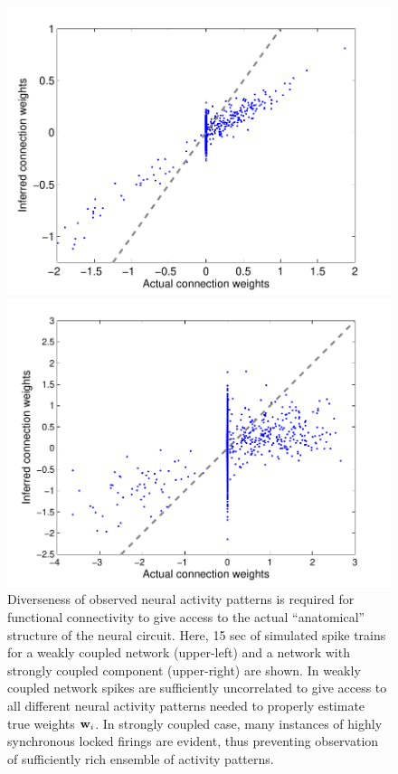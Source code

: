 \begin{figure}[h]
\begin{minipage}[c]{0.45\hsize}
\includegraphics[width=\hsize]{../figs/FigureA8_weak_corr}
\end{minipage}
\begin{minipage}[c]{0.45\hsize}
\includegraphics[width=\hsize]{../figs/FigureA8_strong_corr}
\end{minipage}
\caption{
Diverseness of observed neural activity patterns is required for
functional connectivity to give access to the actual ``anatomical'' structure
of the neural circuit. Here, 15 sec of simulated spike trains for a weakly coupled network (upper-left) and a network with strongly coupled component (upper-right) are shown.
In weakly coupled network spikes are sufficiently uncorrelated to give access to all different neural activity patterns needed to properly estimate true weights ${\bf w}_i$. In strongly coupled case, many instances of highly synchronous locked firings are evident, thus preventing observation of sufficiently rich ensemble of activity patterns.
}
\end{figure}

